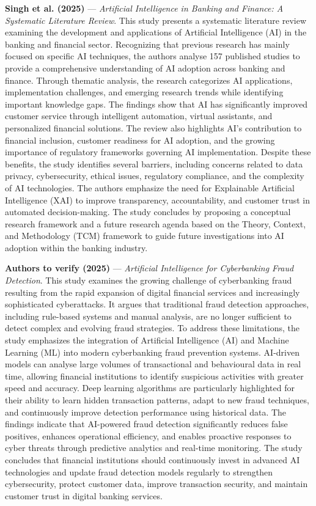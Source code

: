 \documentclass[conference]{IEEEtran}
\begin{document}
\noindent\textbf{Singh et al. (2025)}\nocite{IGI2025} --- \emph{Artificial Intelligence in Banking and Finance: A Systematic Literature Review}. This study presents a systematic literature review examining the development and applications of Artificial Intelligence (AI) in the banking and financial sector. Recognizing that previous research has mainly focused on specific AI techniques, the authors analyse 157 published studies to provide a comprehensive understanding of AI adoption across banking and finance. Through thematic analysis, the research categorizes AI applications, implementation challenges, and emerging research trends while identifying important knowledge gaps. The findings show that AI has significantly improved customer service through intelligent automation, virtual assistants, and personalized financial solutions. The review also highlights AI's contribution to financial inclusion, customer readiness for AI adoption, and the growing importance of regulatory frameworks governing AI implementation. Despite these benefits, the study identifies several barriers, including concerns related to data privacy, cybersecurity, ethical issues, regulatory compliance, and the complexity of AI technologies. The authors emphasize the need for Explainable Artificial Intelligence (XAI) to improve transparency, accountability, and customer trust in automated decision-making. The study concludes by proposing a conceptual research framework and a future research agenda based on the Theory, Context, and Methodology (TCM) framework to guide future investigations into AI adoption within the banking industry.

\par\medskip

\noindent\textbf{Authors to verify (2025)}\nocite{AMLAS2025} --- \emph{Artificial Intelligence for Cyberbanking Fraud Detection}. This study examines the growing challenge of cyberbanking fraud resulting from the rapid expansion of digital financial services and increasingly sophisticated cyberattacks. It argues that traditional fraud detection approaches, including rule-based systems and manual analysis, are no longer sufficient to detect complex and evolving fraud strategies. To address these limitations, the study emphasizes the integration of Artificial Intelligence (AI) and Machine Learning (ML) into modern cyberbanking fraud prevention systems. AI-driven models can analyse large volumes of transactional and behavioural data in real time, allowing financial institutions to identify suspicious activities with greater speed and accuracy. Deep learning algorithms are particularly highlighted for their ability to learn hidden transaction patterns, adapt to new fraud techniques, and continuously improve detection performance using historical data. The findings indicate that AI-powered fraud detection significantly reduces false positives, enhances operational efficiency, and enables proactive responses to cyber threats through predictive analytics and real-time monitoring. The study concludes that financial institutions should continuously invest in advanced AI technologies and update fraud detection models regularly to strengthen cybersecurity, protect customer data, improve transaction security, and maintain customer trust in digital banking services.
\end{document}
